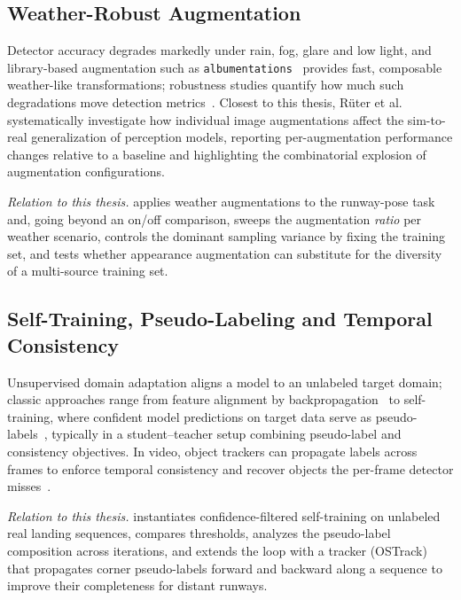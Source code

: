 \subsection{Weather-Robust Augmentation}
\label{subsec:rw-weather}
Detector accuracy degrades markedly under rain, fog, glare and low light, and
library-based augmentation such as \texttt{albumentations}~\cite{albumentations2020}
provides fast, composable weather-like transformations; robustness studies quantify how
much such degradations move detection metrics~\cite{weatherrobust2025}. Closest to this
thesis, Rüter et al.~\cite{ruter2025augmentations} systematically investigate how
individual image augmentations affect the sim-to-real generalization of perception
models, reporting per-augmentation performance changes relative to a baseline and
highlighting the combinatorial explosion of augmentation configurations.

\emph{Relation to this thesis.}  applies weather augmentations to
the runway-pose task and, going beyond an on/off comparison, sweeps the augmentation
\emph{ratio} per weather scenario, controls the dominant sampling variance by fixing the
training set, and tests whether appearance augmentation can substitute for the diversity
of a multi-source training set.

\subsection{Self-Training, Pseudo-Labeling and Temporal Consistency}
\label{subsec:rw-selftraining}
Unsupervised domain adaptation aligns a model to an unlabeled target domain; classic
approaches range from feature alignment by backpropagation~\cite{ganin2015dann} to
self-training, where confident model predictions on target data serve as
pseudo-labels~\cite{lee2013pseudolabel}, typically in a student--teacher setup combining
pseudo-label and consistency objectives. In video, object trackers can propagate labels
across frames to enforce temporal consistency and recover objects the per-frame detector
misses~\cite{ferreira2025landing, runwaysurveillance2026, ostrack2022}.

\emph{Relation to this thesis.}  instantiates confidence-filtered
self-training on unlabeled real landing sequences, compares thresholds, analyzes the
pseudo-label composition across iterations, and extends the loop with a tracker
(OSTrack) that propagates corner pseudo-labels forward and backward along a sequence to
improve their completeness for distant runways.


